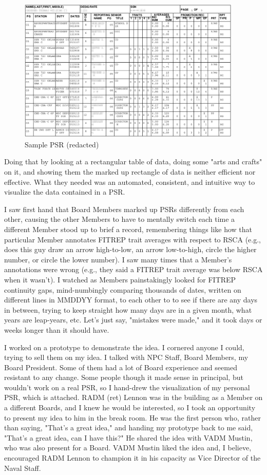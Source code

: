 \documentclass[UTF8]{article}
\begin{document}
\begin{figure}[h!]
 \centering
 \includegraphics[width=0.95\textwidth]{blurred_psr.png}
 \caption{Sample PSR (redacted)}
\end{figure}

Doing that by looking at a rectangular table of data, doing some "arts and crafts" on it, and showing them the marked up rectangle of data is neither efficient nor effective. What they needed was an automated, consistent, and intuitive way to visualize the data contained in a PSR.

I saw first hand that Board Members marked up PSRs differently from each other, causing the other Members to have to mentally switch each time a different Member stood up to brief a record, remembering things like how that particular Member annotates FITREP trait averages with respect to RSCA (e.g., does this guy draw an arrow high-to-low, an arrow low-to-high, circle the higher number, or circle the lower number). I saw many times that a Member's annotations were wrong (e.g., they said a FITREP trait average was below RSCA when it wasn't). I watched as Members painstakingly looked for FITREP continuity gaps, mind-numbingly comparing thousands of dates, written on different lines in MMDDYY format, to each other to to see if there are any days in between, trying to keep straight how many days are in a given month, what years are leap-years, etc. Let's just say, "mistakes were made," and it took days or weeks longer than it should have.

I worked on a prototype to demonstrate the idea. I cornered anyone I could, trying to sell them on my idea. I talked with NPC Staff, Board Members, my Board President. Some of them had a lot of Board experience and seemed resistant to any change. Some people though it made sense in principal, but wouldn't work on a real PSR, so I hand-drew the visualization of my personal PSR, which is attached. RADM (ret) Lennon was in the building as a Member on a different Boards, and I knew he would be interested, so I took an opportunity to present my idea to him in the break room. He was the first person who, rather than saying, "That's a great idea," and handing my prototype back to me said, "That's a great idea, can I have this?" He shared the idea with VADM Mustin, who was also present for a Board. VADM Mustin liked the idea and, I believe, encouraged RADM Lennon to champion it in his capacity as Vice Director of the Naval Staff.
\end{document}
